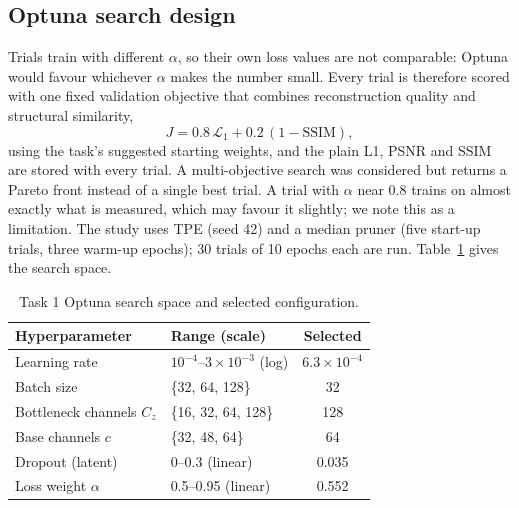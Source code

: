 \documentclass[conference]{IEEEtran}
\begin{document}
\subsection{Optuna search design}
\label{sec:task1_optuna}
Trials train with different $\alpha$, so their own loss values are not
comparable: Optuna would favour whichever $\alpha$ makes the number small.
Every trial is therefore scored with one fixed validation objective that
combines reconstruction quality and structural similarity,
\begin{equation}
J = 0.8\,\mathcal{L}_{1} + 0.2\,(1-\mathrm{SSIM}),
\label{eq:val_obj}
\end{equation}
using the task's suggested starting weights, and the plain L1, PSNR and SSIM
are stored with every trial. A multi-objective search was considered but
returns a Pareto front instead of a single best trial. A trial with
$\alpha$ near 0.8 trains on almost exactly what is measured, which may
favour it slightly; we note this as a limitation. The study uses TPE (seed
42) and a median pruner (five start-up trials, three warm-up epochs); 30
trials of 10 epochs each are run. Table~\ref{tab:task1_space} gives the
search space.

\begin{table}[t]
\centering
\caption{Task 1 Optuna search space and selected configuration.}
\label{tab:task1_space}
\footnotesize
\begin{tabular}{llc}
\toprule
Hyperparameter & Range (scale) & Selected \\
\midrule
Learning rate & $10^{-4}$--$3\times10^{-3}$ (log) & $6.3\times10^{-4}$ \\
Batch size & \{32, 64, 128\} & 32 \\
Bottleneck channels $C_z$ & \{16, 32, 64, 128\} & 128 \\
Base channels $c$ & \{32, 48, 64\} & 64 \\
Dropout (latent) & 0--0.3 (linear) & 0.035 \\
Loss weight $\alpha$ & 0.5--0.95 (linear) & 0.552 \\
\bottomrule
\end{tabular}
\\[3pt]
\end{table}
\end{document}
